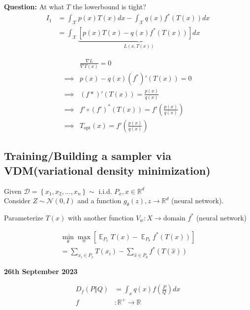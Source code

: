 \documentclass[11pt]{article}
\DeclareMathOperator*{\E}{\mathbb{E}}
\begin{document}
\textbf{Question:} At what $T$ the lowerbound is tight?
\begin{align*}
  I_1 &= \int_{\mathcal{X}} p(x) T(x) dx - \int_{\mathcal{X}} q(x) f^{*}(T(x))dx \\
  &= \int_{\mathcal{X}} \underbrace{\left[ p(x)T(x) - q(x)f^{*}(T(x)) \right] dx}_{L(x, T(x))}
\end{align*}

\begin{align*}
  &\frac{\nabla L}{\nabla T(x)} = 0 \\
  \implies &p(x) - q(x) (f^{*})'(T(x)) = 0 \\
  \implies &(f*)'(T(x)) = \frac{p(x)}{q(x)} \\
  \implies &f' \circ (f')^{*} (T(x)) = f' \left( \frac{p(x)}{q(x)} \right) \\
  \implies &T_{\text{opt}}(x) = f' \left( \frac{p(x)}{q(x)} \right)
\end{align*}

\subsection{Training/Building a sampler via VDM(variational density minimization)}
Given $\mathcal{D} = \left\{ x_1, x_2, ..., x_n \right\} \sim $ i.i.d. $P_x, x \in \mathbb{R}^d$ \\
Consider $Z \sim \mathcal{N}(0, I)$ and a function $g_{\theta}(z), z \rightarrow \mathbb{R}^d$ (neural network).

\begin{figure}[h]
  \centering
\end{figure}

Parameterize $T(x)$ with another function $V_w: X \rightarrow \text{domain }f^{*}$ (neural network)

\begin{align*}
  \min_{\theta}\max_w \left[ \E_{P_x} T(x) - \E_{P_{\theta}} f^{*}(T(x)) \right] \\
  = \sum_{x_i \in P_x} T(x_i) - \sum_{\hat{x} \in P_{\theta}} f^{*}(T(\hat{x}))
\end{align*}

\vspace{1em}
\textbf{26th September 2023}

\begin{align*}
  D_f(P \Vert Q) &= \int_x q(x) f \left( \frac{P}{Q} \right) dx \\
                   f &: \mathbb{R}^+ \rightarrow \mathbb{R}
\end{align*}
\end{document}
